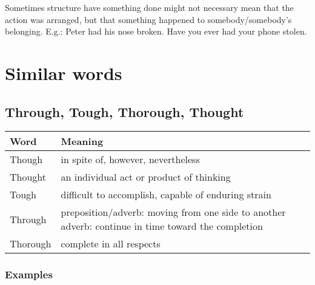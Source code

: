 \documentclass[a4paper,12pt]{report}
\begin{document}
Sometimes structure have something done might not necessary mean that the action was arranged, but that something happened to somebody/somebody's belonging.
E.g.: Peter had his nose broken. Have you ever had your phone stolen.






\section{Similar words}



\subsection{Through, Tough, Thorough, Thought}


\begin{center}
  \begin{tabular}{| m{3cm} || m{12cm} | }
    \hline
    Word     & Meaning                                                                                                     \\
    \hline
    \hline
    Though   & in spite of, however, nevertheless                                                                          \\
    \hline
    Thought  & an individual act or product of thinking                                                                    \\
    \hline
    Tough    & difficult to accomplish, capable of enduring strain                                                         \\
    \hline
    Through  & preposition/adverb: moving from one side to another \newline adverb: continue in time toward the completion \\
    \hline
    Thorough & complete in all respects                                                                                    \\
    \hline
  \end{tabular}
\end{center}

\subsubsection{Examples}
\end{document}
